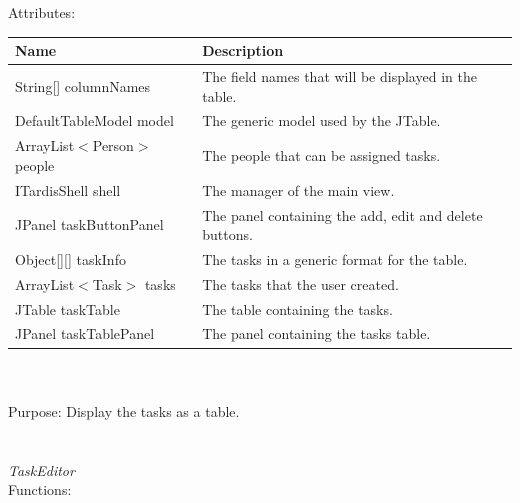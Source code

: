 Attributes:\\
\begin{tabular}{| l | l |}
\hline
Name & Description\\
\hline
String[] columnNames & The field names that will be displayed in the table.\\
\hline
DefaultTableModel model & The generic model used by the JTable.\\
\hline
ArrayList$<$Person$>$ people & The people that can be assigned tasks.\\
\hline
ITardisShell shell & The manager of the main view.\\
\hline
JPanel taskButtonPanel & The panel containing the add, edit and delete buttons.\\
\hline
Object[][] taskInfo & The tasks in a generic format for the table.\\
\hline
ArrayList$<$Task$>$ tasks & The tasks that the user created.\\
\hline
JTable taskTable & The table containing the tasks.\\
\hline
JPanel taskTablePanel & The panel containing the tasks table.\\
\hline
\end{tabular}\\
\\
Purpose: Display the tasks as a table.\\
\\
\\
\emph{TaskEditor}\\
Functions:\\
